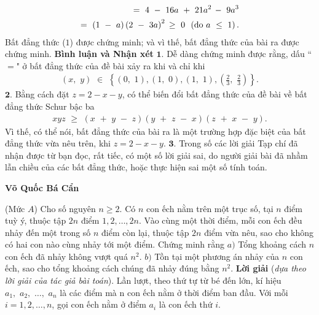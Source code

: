 \begin{multicols}{2}
\begin{align*}
		 = \,\,4\,\, - \,\,16a\,\, + \,\,21{a^2}\, - \,\,9{a^3}\\
		= \,\,\left( {1\,\, - \,\,a} \right){\left( {2\,\, - \,\,3a} \right)^2}\, \ge \,\,0\,\,\,\left( {{\rm{do}}\,\,a\,\, \le \,\,1} \right).
	\end{align*}
	Bất đẳng thức ($1$) được chứng minh; và vì thế, bất đẳng thức của bài ra được chứng minh.
	\vskip 0.05cm
	\textbf{Bình luận và Nhận xét}
	\vskip 0.05cm
	$\pmb{1.}$ Dễ dàng chứng minh được rằng, dấu ``$=$" ở bất đẳng thức của đề bài xảy ra khi và chỉ khi
	\begin{align*}
		\left( {x,\,\,y} \right)\,\, \in \,\,\left\{ {\left( {0,\,\,1} \right),\left( {1,\,\,0} \right),\left( {1,\,\,1} \right),\left( {\frac{2}{3},\,\,\frac{2}{3}} \right)} \right\}.
	\end{align*}
	$\pmb{2.}$ Bằng cách đặt $z = 2 - x - y$, có thể biến đổi bất đẳng thức của đề bài về bất đẳng thức Schur bậc ba
	\begin{align*}
		xyz\,\, \ge \,\,\left( {x\,\, + \,\,y\,\, - \,\,z} \right)\left( {y\,\, + \,\,z\,\, - \,\,x} \right)\left( {z\,\, + \,\,x\,\, - \,\,y} \right).
	\end{align*}
	Vì thế, có thể nói, bất đẳng thức của bài ra là một trường hợp đặc biệt của bất đẳng thức vừa nêu trên, khi $z = 2 - x - y$.
	\vskip 0.05cm
	$\pmb{3.}$ Trong số các lời giải Tạp chí đã nhận được từ bạn đọc, rất tiếc, có một số lời giải sai, do người giải bài đã nhầm lẫn chiều của các bất đẳng thức, hoặc thực hiện sai một số tính toán.
	\begin{flushright}
		\textbf{Võ Quốc Bá Cẩn}
	\end{flushright}
	{}
	(Mức $A$) Cho số nguyên $n\ge2$. Có $n$ con ếch nằm trên một trục số, tại $n$ điểm tuỳ ý, thuộc tập $2n$ điểm $1,2,\ldots,2n$. Vào cùng một thời điểm, mỗi con ếch đều nhảy đến một trong số $n$ điểm còn lại, thuộc tập $2n$ điểm vừa nêu, sao cho không có hai con nào cùng nhảy tới một điểm. Chứng minh rằng
	\vskip 0.05cm
	$a)$ Tổng khoảng cách $n$ con ếch đã nhảy không vượt quá $n^2$. 
	\vskip 0.05cm
	$b)$ Tồn tại một phương án nhảy của $n$ con ếch, sao cho tổng khoảng cách chúng đã nhảy đúng bằng $n^2$. 
	\vskip 0.05cm
	\textbf{Lời giải} (\textit{dựa theo lời giải của tác giả bài toán}).
	\vskip 0.05cm
	Lần lượt, theo thứ tự từ bé đến lớn, kí hiệu ${a_1},\,\,{a_2},\,\, \ldots ,\,\,{a_n}$  là các điểm mà n con ếch nằm ở thời điểm ban đầu.
	\vskip 0.05cm
	Với mỗi $i = 1, 2, \ldots, n$, gọi con ếch nằm ở điểm  $a_i$ là con ếch thứ $i$.
	\vskip 0.05cm

\end{multicols}
